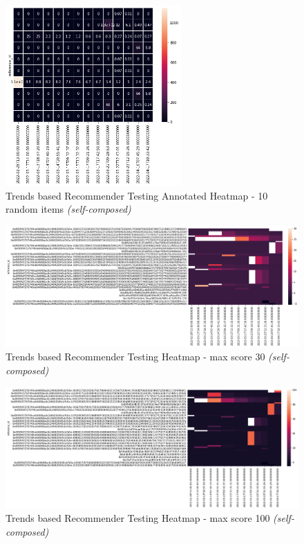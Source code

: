 \begin{figure}[h!]
\centering
\includegraphics[width=0.6\textwidth]{images/Testing/trends/trends-heatmap-10-rand-annot.png}
\caption{Trends based Recommender Testing Annotated Heatmap - 10 random items \textit{(self-composed)}}
\label{fig:trends-recsys-heatmap-10-anot}
\end{figure}

\begin{figure}[h!]
\centering
\includegraphics[width=\textwidth]{images/Testing/trends/trends-heatmap-30-labeled.png}
\caption{Trends based Recommender Testing Heatmap - max score 30 \textit{(self-composed)}}
\label{fig:trends-recsys-heatmap-30-labeled}
\end{figure}

\begin{figure}[h!]
\centering
\includegraphics[width=\textwidth]{images/Testing/trends/trends-heatmap-100.png}
\caption{Trends based Recommender Testing Heatmap - max score 100 \textit{(self-composed)}}
\label{fig:trends-recsys-heatmap-100}
\end{figure}

